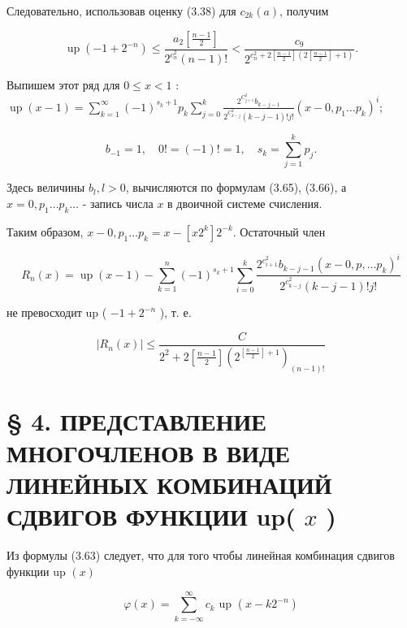 \documentclass[10pt]{article}
\begin{document}
Следовательно, использовав оценку (3.38) для $c_{2 k}(a)$, получим


\begin{equation*}
\operatorname{up}\left(-1+2^{-n}\right) \leqslant \frac{a_{2}\left[\frac{n-1}{2}\right]}{2^{c_{n}^{2}}(n-1)!}<\frac{c_{9}}{2^{c_{n}^{2}+2\left[\frac{n-1}{2}\right]\left(2\left[\frac{n-1}{2}\right]+1\right)}} . \tag{3.72}
\end{equation*}


Выпишем этот ряд для $0 \leqslant x<1$ :\\
$\operatorname{up}(x-1)=\sum_{k=1}^{\infty}(-1)^{s_{k}+1} p_{k} \sum_{j=0}^{k} \frac{2^{C_{j+1}^{2}} b_{k-j-1}}{2^{C_{k-j}^{2}}(k-j-1)!j!}\left(x-0, p_{1} \ldots p_{k}\right)^{i}$;


\begin{equation*}
b_{-1}=1, \quad 0!=(-1)!=1, \quad s_{k}=\sum_{j=1}^{k} p_{j} . \tag{3.73}
\end{equation*}


Здесь величины $b_{l}, l>0$, вычисляются по формулам (3.65), (3.66), а $x=0, p_{1} \ldots p_{k} \ldots$ - запись числа $x$ в двоичной системе счисления.

Таким образом, $x-0, p_{1} \ldots p_{k}=x-\left[x 2^{k}\right] 2^{-k}$. Остаточный член


\begin{equation*}
R_{n}(x)=\operatorname{up}(x-1)-\sum_{k=1}^{n}(-1)^{s_{k}+1} \sum_{i=0}^{k} \frac{2^{c_{i+1}^{2}} b_{k-j-1}\left(x-0, p, \ldots p_{k}\right)^{i}}{2^{c_{k-j}^{2}}(k-j-1)!j!} \tag{3.74}
\end{equation*}


не превосходит up ( $-1+2^{-n}$ ), т. е.


\begin{equation*}
\left|R_{n}(x)\right| \leqslant \frac{C}{2^{2}+2\left[\frac{n-1}{2}\right]\left(2^{\left[\frac{n-1}{2}\right]+1}\right)_{(n-1)!}} \tag{3.75}
\end{equation*}


\section*{§ 4. ПРЕДСТАВЛЕНИЕ МНОГОЧЛЕНОВ В ВИДЕ ЛИНЕЙНЫХ КОМБИНАЦИЙ СДВИГОВ ФУНКЦИИ up( $x$ )}
Из формулы (3.63) следует, что для того чтобы линейная комбинация сдвигов функции up $(x)$


\begin{equation*}
\varphi(x)=\sum_{k=-\infty}^{\infty} c_{k} \text { up }\left(x-k 2^{-n}\right) \tag{3.76}
\end{equation*}
\end{document}
